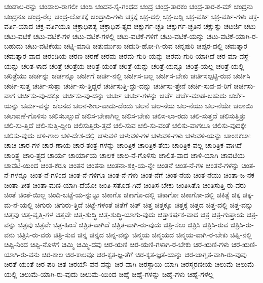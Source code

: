 {ಚಂಡಾಲ-ರನ್ನು
ಚಂಡಾಲ-ರಾಗಲೀ
ಚಂಡಿ
ಚಂದನ-ಸೈ-ಗಂಧದ
ಚಂದ್ರ
ಚಂದ್ರ-ತಾರಕಂ
ಚಂದ್ರ-ತಾರ-ಕ-ಮ್
ಚಂದ್ರನು
ಚಂದ್ರನೂ
ಚಂದ್ರ-ರೆಲ್ಲ
ಚಂದ್ರ-ಲೋಕಕ್ಕೆ
ಚಂದ್ರಾದಿ-ಗಳು
ಚಕ್ರಕ್ಕೆ
ಚಕ್ರ-ದಲ್ಲಿ
ಚಕ್ರ-ಬಡ್ಡಿ
ಚಕ್ರ-ವರ್ತಿ
ಚಕ್ರ-ವರ್ತಿ-ಗಳು
ಚಕ್ರ-ವರ್ತಿ-ಯಾದ
ಚಕ್ರ-ವರ್ತಿಯೂ
ಚಕ್ರಾಧಿಪತ್ಯ
ಚಕ್ರಾಧಿಪ-ತ್ಯದ
ಚಕ್ಷುರ್ಗ-ಚ್ಛತಿ
ಚಕ್ಷುರ್ಗ-ಚ್ಛತಿನ
ಚಕ್ಷುಸ್ಸು
ಚಟರ್ಜಿ
ಚಟು
ಚಟು-ವಟಿಕೆ
ಚಟು-ವಟಿಕೆ-ಗಳ
ಚಟು-ವಟಿಕೆ-ಗಳಲ್ಲಿ
ಚಟು-ವಟಿಕೆ-ಗಳಿಗೆ
ಚಟು-ವಟಿಕೆ-ಯನ್ನು
ಚಟು-ವಟಿಕೆ-ಯಾಗಿ-ರ-ಬಹುದು
ಚಟು-ವಟಿಕೆಯು
ಚಟ್ನಿ-ಮಾಡಿ
ಚತುರ್ಮುಖ
ಚದುರಿ-ಹೋ-ಗಿ-ರುವ
ಚನ್ನಪುರಿ
ಚಪ್ಪರ-ದಲ್ಲಿ
ಚಮತ್ಕಾರ
ಚಮತ್ಕಾರ-ವಾದ
ಚರಂಡಿಯ
ಚರಣ
ಚರಣೆ
ಚರಮ
ಚರಮ-ಗುರಿ-ಯನ್ನು
ಚರಮ-ಗುರಿ-ಯಾಗಿದೆ
ಚರ-ಮಾ-ವಸ್ಥೆ-ಯನ್ನು
ಚರಿತ-ಳಾದ
ಚರಿತ್ರೆ
ಚರಿತ್ರೆಯ
ಚರಿತ್ರೆ-ಯಂತೆ
ಚರಿತ್ರೆ-ಯನ್ನು
ಚರಿತ್ರೆ-ಯನ್ನೂ
ಚರಿತ್ರೆ-ಯಲ್ಲ
ಚರಿತ್ರೆ-ಯಲ್ಲಿ
ಚರಿತ್ರೆಯು
ಚರ್ಚನ್ನು
ಚರ್ಚನ್ನೂ
ಚರ್ಚಿಗೆ
ಚರ್ಚಿ-ನಲ್ಲಿ
ಚರ್ಚಿಸ-ಬಲ್ಲ
ಚರ್ಚಿಸ-ಬೇಕು
ಚರ್ಚಿಸಲ್ಪಟ್ಟಿ-ರುವ
ಚರ್ಚಿಸಿ
ಚರ್ಚಿ-ಸುತ್ತ
ಚರ್ಚಿ-ಸುತ್ತಾ
ಚರ್ಚಿ-ಸು-ತ್ತಿದ್ದರೆ
ಚರ್ಚಿಸುತ್ತಿ-ದ್ದು-ದನ್ನು
ಚರ್ಚಿಸು-ತ್ತೇನೆ
ಚರ್ಚಿ-ಸುವ-ವ-ರಿಗೆ
ಚರ್ಚಿಸು-ವಾಗ
ಚರ್ಚಿಸು-ವು-ದಕ್ಕೂ
ಚರ್ಚಿಸು-ವು-ದನ್ನು
ಚರ್ಚು
ಚರ್ಚು-ಗಳನ್ನು
ಚರ್ಚೆ
ಚರ್ಚೆ-ಮಾಡ-ಬಹುದು
ಚರ್ಚೆ-ಯನ್ನು
ಚರ್ಮ-ವನ್ನು
ಚಲನದ
ಚಲನ-ಶೀಲ-ವಾದು-ದೆಂದು
ಚಲನೆ
ಚಲ-ನೆಯ
ಚಲ-ನೆಯು
ಚಲ-ನೆಯೇ
ಚಲಾಯಿ
ಚಲಾವಣೆ-ಗೊಳಿಸು
ಚಲಿಸಬಲ್ಲುದೆ
ಚಲಿಸ-ಬೇಕಾಗಿಲ್ಲ
ಚಲಿಸ-ಬೇಕು
ಚಲಿಸ-ಲಾ-ರದು
ಚಲಿ-ಸುತ್ತದೆ
ಚಲಿಸುತ್ತಿತ್ತು
ಚಲಿ-ಸು-ತ್ತಿದೆ
ಚಲಿ-ಸುತ್ತಿ-ದ್ದೀರಿ
ಚಲಿಸುತ್ತಿರು-ತ್ತದೆ
ಚಲಿ-ಸುವ
ಚಲಿ-ಸು-ವಂತೆ
ಚಲಿಸು-ವಾಗಲೂ
ಚಲಿಸು-ವುದಕ್ಕೇ
ಚಲಿಸು-ವುದು
ಚಳಿ-ಗಾಲ
ಚಳಿ-ದೇಶ-ದಲ್ಲಿ
ಚಳುವಳಿ
ಚಳುವಳಿ-ಗಳ
ಚಳುವಳಿ-ಗಳು
ಚಳುವಳಿ-ಯನ್ನು
ಚಾಂಶಕಲಾಃ
ಚಾಚಿ
ಚಾರ-ಗಳ
ಚಾರ-ಣಾಯ
ಚಾರ-ತಂತ್ರ-ಗಳನ್ನು
ಚಾರಿತ್ರಿಕ
ಚಾರಿತ್ರಿಕ-ತೆಯ
ಚಾರಿತ್ರಿಕ-ವಲ್ಲ
ಚಾರಿತ್ರಿಕ-ವಾಗಿದೆ
ಚಾರಿತ್ರ್ಯ
ಚಾರಿ-ತ್ರ್ಯದ
ಚಾರ್ಯ
ಚಾರ್ಯಾಯ
ಚಾಲಕ
ಚಾಲ-ನೆ-ಗೊಳಿಸು
ಚಾಲಿತ-ವಾದ
ಚಾಳಿ-ಯಾಗಿ
ಚಾವಟಿಯ
ಚಾವಟಿ-ಯಿಂದ
ಚಿಂತ-ಕರೂ
ಚಿಂತನ
ಚಿಂತನಾ
ಚಿಂತನಾ-ಶಕ್ತಿ-ಯ-ನ್ನೇ
ಚಿಂತನೆ
ಚಿಂತ-ನೆ-ಗಳ
ಚಿಂತನೆ-ಗಳನ್ನು
ಚಿಂತ-ನೆ-ಗಳನ್ನೂ
ಚಿಂತ-ನೆ-ಗಳಿಂದ
ಚಿಂತ-ನೆ-ಗಳಿಗೂ
ಚಿಂತ-ನೆ-ಗಳು
ಚಿಂತ-ನೆಗೆ
ಚಿಂತ-ನೆಯ
ಚಿಂತ-ನೆಯು
ಚಿಂತಾ-ಜ-ನಕ
ಚಿಂತಾ-ತೀತ
ಚಿಂತಾ-ಮಣಿ-ಯಾಗಿ-ದೆಯೋ
ಚಿಂತಿ-ಸತೊಡ-ಗಿದೆ
ಚಿಂತಿಸ-ಬೇಕು
ಚಿಂತಿಸಿತೊ
ಚಿಂತಿಸುತ್ತಿ-ರು-ವರು
ಚಿಂತೆ
ಚಿಂತೆ-ಯಿಲ್ಲ
ಚಿಂದಿ-ಬಟ್ಟೆ-ಯ-ನ್ನುಟ್ಟು
ಚಿಕಾಗೊ
ಚಿಕಾಗೊ-ದಲ್ಲಿ
ಚಿಕಾಗೋ
ಚಿಕಾಗೋ-ದಲ್ಲಿ
ಚಿಕಿತ್ಸೆ
ಚಿಕ್ಕ
ಚಿಕ್ಕ-ಮ-ನೆ-ಯಲ್ಲಿ
ಚಿಗುರು
ಚಿಗುರು-ತ್ತಿದೆ
ಚಿಟ್ಟೆ-ಗಳಂತೆ
ಚಿತೆಗೆ
ಚಿತ್
ಚಿತ್ತ
ಚಿತ್ತಕ್ಕೂ
ಚಿತ್ತಕ್ಕೆ
ಚಿತ್ತದ
ಚಿತ್ತ-ದಲ್ಲಿ
ಚಿತ್ತ-ವನ್ನು
ಚಿತ್ತವು
ಚಿತ್ತ-ವೃತ್ತಿ-ಗಳ
ಚಿತ್ತವೇ
ಚಿತ್ತ-ಶುದ್ಧಿ
ಚಿತ್ತ-ಶುದ್ಧಿ-ಯಾಗು-ವುದು
ಚಿತ್ತಾಕರ್ಷಕ-ವಾದ
ಚಿತ್ರ
ಚಿತ್ರ-ಗುಪ್ತಾಯ
ಚಿತ್ರ-ವನ್ನು
ಚಿತ್ರವು
ಚಿತ್ರವೇ
ಚಿತ್ರ-ಹಿಂಸೆ
ಚಿತ್ರಿತ-ವಾಗಿದೆ
ಚಿತ್ರಿತ-ವಾಗಿ-ರು-ವುದು
ಚಿತ್ರಿ-ಸಲು
ಚಿತ್ರಿಸಿ
ಚಿತ್ರಿಸಿ-ರುವ
ಚಿತ್ರಿಸಿ-ರು-ವನು
ಚಿತ್ರಿಸಿ-ರು-ವರು
ಚಿತ್ರಿ-ಸುವ
ಚಿನ್ನ
ಚಿನ್ನದ
ಚಿನ್ನ-ವನ್ನು
ಚಿನ್ಮಯ
ಚಿನ್ಮಯದ
ಚಿನ್ಮಯ-ವಾಗಿ-ರ-ಬೇಕು
ಚಿಪ್ಪಿ-ನಲ್ಲಿ
ಚಿಪ್ಪಿ-ನಿಂದ
ಚಿಪ್ಪಿ-ನೊಳಗೆ
ಚಿಮ್ಮಿ
ಚಿಮ್ಮಿ-ದವು
ಚಿರ-ಋಣಿ
ಚಿರ-ಋಣಿ-ಗಳಾಗಿ-ರ-ಬೇಕು
ಚಿರ-ಋಣಿ-ಗಳು
ಚಿರ-ಋಣಿ-ಯಾಗಿ-ರು-ವನು
ಚಿರ-ಕಾಲ
ಚಿರ-ಕಾಲವೂ
ಚಿರ-ಕೃತ-ಜ್ಞ-ತೆಗೆ
ಚಿರ-ಕೃತ-ಜ್ಞತೆ-ಯನ್ನು
ಚಿರ-ಜಾಗೃತ-ವಾಗಿ-ರು-ವುವು
ಚಿರತೆ-ಯಂತೆ
ಚಿರ-ಪರಿ-ಚಿತ
ಚಿರಯೌ-ವನ-ವನ್ನು
ಚಿರ-ವಾಗಿ
ಚಿರಸ್ಥಾಯಿ-ಯಾಗಿ
ಚಿರಸ್ಮರಣೀಯ
ಚಿಲುಮೆ
ಚಿಲುಮೆ-ಯಲ್ಲಿ
ಚಿಲುಮೆ-ಯಾಗಿ-ರು-ವುದು
ಚಿಲುಮೆ-ಯಿಂದ
ಚಿಹ್ನೆ
ಚಿಹ್ನೆ-ಗಳನ್ನು
ಚಿಹ್ನೆ-ಗಳು
ಚಿಹ್ನೆ-ಗಳೆಲ್ಲ
}
